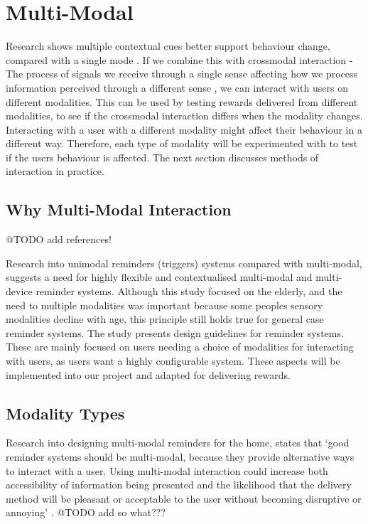 
\newpage

\section{Multi-Modal}
Research shows multiple contextual cues better support behaviour change, compared with a single mode \cite{article_understanding_use_contextual_cues_design_impl}. If we combine this with crossmodal interaction - The process of signals we receive through a single sense affecting how we process information perceived through a different sense \cite{article_natural_cross_modal_mappings}, we can interact with users on different modalities. This can be used by testing rewards delivered from different modalities, to see if the crossmodal interaction differs when the modality changes.\newline
\newline
Interacting with a user with a different modality might affect their behaviour in a different way. Therefore, each type of modality will be experimented with to test if the users behaviour is affected. The next section discusses methods of interaction in practice.

\subsection{Why Multi-Modal Interaction}
@TODO add references!

Research \cite{article_user_centred_multimodal_reminders} into unimodal reminders (triggers) systems compared with multi-modal, suggests a need for highly flexible and contextualised multi-modal and multi-device reminder systems. Although this study focused on the elderly, and the need to multiple modalities was important because some peoples sensory modalities decline with age, this principle still holds true for general case reminder systems. The study presents design guidelines for reminder systems. These are mainly focused on users needing a choice of modalities for interacting with users, as users want a highly configurable system. These aspects will be implemented into our project and adapted for delivering rewards.

\subsection{Modality Types}
Research into designing multi-modal reminders for the home, states that `good reminder systems should be multi-modal, because they provide alternative ways to interact with a user. Using multi-modal interaction could increase both accessibility of information being presented and the likelihood that the delivery method will be pleasant or acceptable to the user without becoming disruptive or annoying' \cite{article_designing_multimodal_reminders_for_home}. @TODO add so what???


